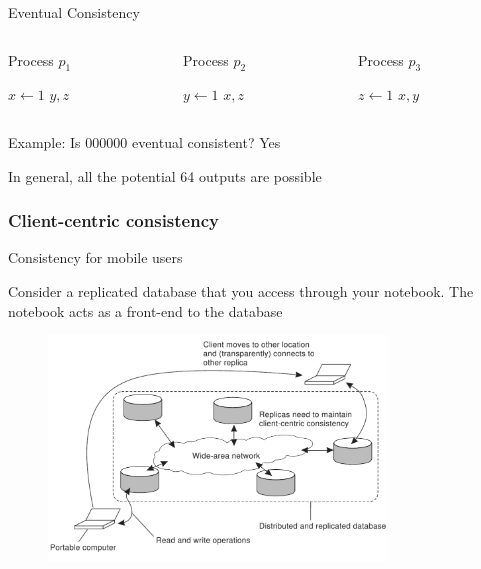 \begin{frame}{Eventual Consistency}
\begin{columns}
\begin{column}{0.30\textwidth}	
\begin{Procedure}
\caption{Process $p_1$}
$x \gets 1$\;
\PRINT $y,z$
\end{Procedure}
\end{column}
\hfill
\begin{column}{0.30\textwidth}	
\begin{Procedure}
\caption{Process $p_2$}
$y \gets 1$\;
\PRINT $x,z$
\end{Procedure}
\end{column}
\hfill
\begin{column}{0.30\textwidth}	
\begin{Procedure}
\caption{Process $p_3$}
$z \gets 1$\;
\PRINT $x,y$
\end{Procedure}
\end{column}	
\end{columns}

\BIL	
\item Example: Is 000000 eventual consistent?  \pause Yes
\item In general, all the potential 64 outputs are possible
\EIL

\end{frame}

\subsubsection{Client-centric consistency}

\begin{frame}{Consistency for mobile users}

Consider a replicated database that you access through your notebook. 
The notebook acts as a front-end to the database

\begin{figure}
	\includegraphics[width=0.8\textwidth]{figs/09/mobile}
\end{figure}

\end{frame}

